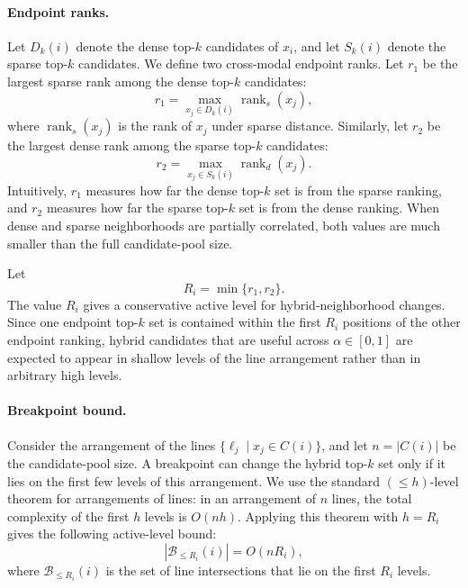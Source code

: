 \paragraph{Endpoint ranks.}
Let $D_k(i)$ denote the dense top-$k$ candidates of $x_i$, and let $S_k(i)$ denote the sparse top-$k$ candidates. We define two cross-modal endpoint ranks. Let $r_1$ be the largest sparse rank among the dense top-$k$ candidates:
\begin{equation}
    r_1=\max_{x_j\in D_k(i)}\operatorname{rank}_s(x_j),
\end{equation}
where $\operatorname{rank}_s(x_j)$ is the rank of $x_j$ under sparse distance. Similarly, let $r_2$ be the largest dense rank among the sparse top-$k$ candidates:
\begin{equation}
    r_2=\max_{x_j\in S_k(i)}\operatorname{rank}_d(x_j).
\end{equation}
Intuitively, $r_1$ measures how far the dense top-$k$ set is from the sparse ranking, and $r_2$ measures how far the sparse top-$k$ set is from the dense ranking. When dense and sparse neighborhoods are partially correlated, both values are much smaller than the full candidate-pool size.

Let
\begin{equation}
    R_i=\min\{r_1,r_2\}.
\end{equation}
The value $R_i$ gives a conservative active level for hybrid-neighborhood changes. Since one endpoint top-$k$ set is contained within the first $R_i$ positions of the other endpoint ranking, hybrid candidates that are useful across $\alpha\in[0,1]$ are expected to appear in shallow levels of the line arrangement rather than in arbitrary high levels.

\paragraph{Breakpoint bound.}
Consider the arrangement of the lines $\{\ell_j\mid x_j\in C(i)\}$, and let $n=|C(i)|$ be the candidate-pool size. A breakpoint can change the hybrid top-$k$ set only if it lies on the first few levels of this arrangement. We use the standard $(\leq h)$-level theorem for arrangements of lines: in an arrangement of $n$ lines, the total complexity of the first $h$ levels is $O(nh)$. Applying this theorem with $h=R_i$ gives the following active-level bound:
\begin{equation}
    |\mathcal{B}_{\le R_i}(i)|=O(nR_i),
\end{equation}
where $\mathcal{B}_{\le R_i}(i)$ is the set of line intersections that lie on the first $R_i$ levels.

